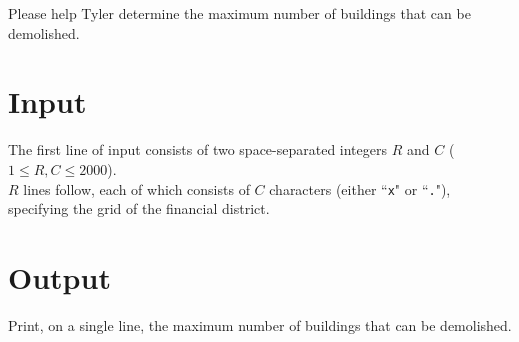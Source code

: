 Please help Tyler determine the maximum number of buildings that can be demolished.

\section*{Input}
The first line of input consists of two space-separated integers $R$ and $C$ ($1 \le R, C \le 2000$).\\
$R$ lines follow, each of which consists of $C$ characters (either ``\texttt{x}" or ``\texttt{.}"), specifying the grid of the financial district.

\section*{Output}
Print, on a single line, the maximum number of buildings that can be demolished.\\
